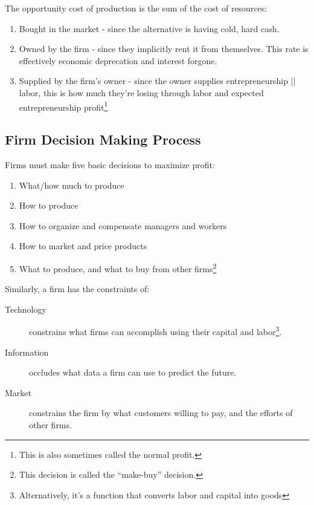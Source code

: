                     The opportunity cost of production is the sum of the cost of resources:
                    \begin{enumerate}
                        \item Bought in the market - since the alternative is having cold, hard cash.
                        \item Owned by the firm - since they implicitly rent it from themselves.
                        This rate is effectively economic deprecation and interest forgone.
                        \item Supplied by the firm's owner - since the owner supplies entrepreneurship || labor, this is how much they're losing through labor and expected entrepreneurship profit\footnote{This is also sometimes called the normal profit.}
                    \end{enumerate}
                 \subsection{Firm Decision Making Process} %
                 \label{sub:firm_decision_making_process}
                    Firms must make five basic decisions to maximize profit:
                    \begin{enumerate}
                        \item What/how much to produce
                        \item How to produce
                        \item How to organize and compensate managers and workers
                        \item How to market and price products
                        \item What to produce, and what to buy from other firms\footnote{This decision is called the ``make-buy'' decision.}
                    \end{enumerate}
                    Similarly, a firm has the constraints of:
                    \begin{description}
                        \item[Technology] constrains what firms can accomplish using their capital and labor\footnote{Alternatively, it's a function that converts labor and capital into goods}.
                        \item[Information] occludes what data a firm can use to predict the future.
                        \item[Market] constrains the firm by what customers willing to pay, and the efforts of other firms.
                    \end{description}
